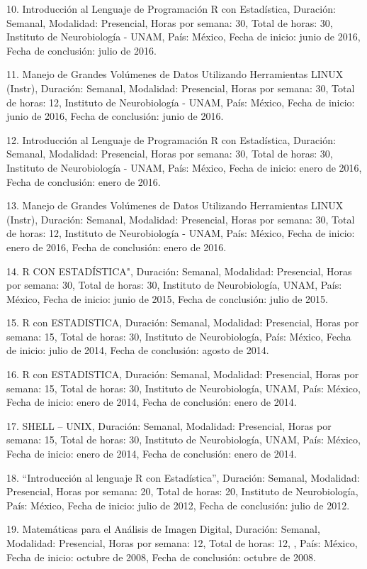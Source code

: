 \documentclass[12pt]{article}
\begin{document}
10. Introducción al Lenguaje de Programación R con Estadística, Duración: Semanal, Modalidad: Presencial, Horas por semana: 30, Total 
de horas: 30, Instituto de Neurobiología - UNAM, País: México, Fecha de inicio: junio de 2016, Fecha de conclusión: julio de 2016.

11. Manejo de Grandes Volúmenes de Datos Utilizando Herramientas LINUX (Instr), Duración: Semanal, Modalidad: Presencial, Horas por 
semana: 30, Total de horas: 12, Instituto de Neurobiología - UNAM, País: México, Fecha de inicio: junio de 2016, Fecha de conclusión: 
junio de 2016.

12. Introducción al Lenguaje de Programación R con Estadística, Duración: Semanal, Modalidad: Presencial, Horas por semana: 30, Total 
de horas: 30, Instituto de Neurobiología - UNAM, País: México, Fecha de inicio: enero de 2016, Fecha de conclusión: enero de 2016.

13. Manejo de Grandes Volúmenes de Datos Utilizando Herramientas LINUX (Instr), Duración: Semanal, Modalidad: Presencial, Horas por 
semana: 30, Total de horas: 12, Instituto de Neurobiología - UNAM, País: México, Fecha de inicio: enero de 2016, Fecha de conclusión: 
enero de 2016.

14. R CON ESTADÍSTICA", Duración: Semanal, Modalidad: Presencial, Horas por semana: 30, Total de horas: 30, Instituto de Neurobiología, 
UNAM, País: México, Fecha de inicio: junio de 2015, Fecha de conclusión: julio de 2015.

15. R con ESTADISTICA, Duración: Semanal, Modalidad: Presencial, Horas por semana: 15, Total de horas: 30, Instituto de Neurobiología, 
País: México, Fecha de inicio: julio de 2014, Fecha de conclusión: agosto de 2014.

16. R con ESTADISTICA, Duración: Semanal, Modalidad: Presencial, Horas por semana: 15, Total de horas: 30, Instituto de Neurobiología, 
UNAM, País: México, Fecha de inicio: enero de 2014, Fecha de conclusión: enero de 2014.

17. SHELL – UNIX, Duración: Semanal, Modalidad: Presencial, Horas por semana: 15, Total de horas: 30, Instituto de Neurobiología, UNAM, 
País: México, Fecha de inicio: enero de 2014, Fecha de conclusión: enero de 2014.

18. “Introducción al lenguaje R con Estadística”, Duración: Semanal, Modalidad: Presencial, Horas por semana: 20, Total de horas: 20, 
Instituto de Neurobiología, País: México, Fecha de inicio: julio de 2012, Fecha de conclusión: julio de 2012.

19. Matemáticas para el Análisis de Imagen Digital, Duración: Semanal, Modalidad: Presencial, Horas por semana: 12, Total de horas: 12, 
, País: México, Fecha de inicio: octubre de 2008, Fecha de conclusión: octubre de 2008.
\end{document}
